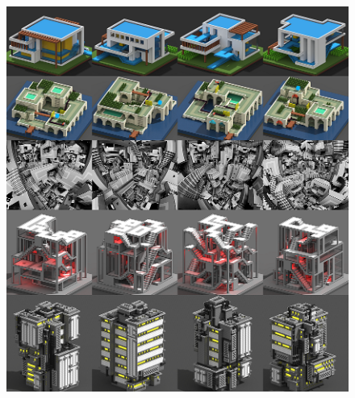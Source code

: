 \begin{figure} [ht]
  \centering
  \includegraphics[trim={0 6.6cm 0 14cm},clip, width=1\textwidth]{Bilder/MaximGuminBuilding1.png}\
    \caption{}
  \label{fig:gliederung}
\end{figure}

